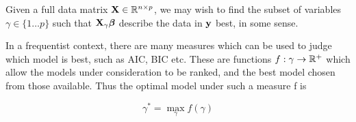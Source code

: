 \documentclass{article}[12pt]
\begin{document}
Given a full data matrix ${\bf X} \in {\mathbb{R}}^{n \times p}$, we may wish to find the subset of variables
$\gamma \in \{ 1 \ldots p \}$ such that ${\bf X}_\gamma {\boldsymbol\beta}$ describe the data in ${\bf y}$ best, in some
sense.

In a frequentist context, there are many measures which can be used to judge which model is best,
such as AIC, BIC etc. These are functions $f: \gamma \to {\mathbb{R}}^+$ which allow the models under consideration to
be ranked, and the best model chosen from those available. Thus the optimal model under such a measure
f is

$$
\gamma^* = \max_\gamma f(\gamma)
$$



\end{document}
